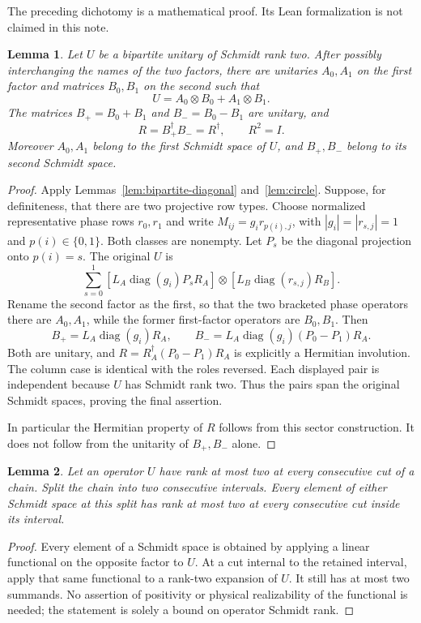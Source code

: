 \documentclass[11pt]{article}
\newtheorem{lemma}{Lemma}
\begin{document}
The preceding dichotomy is a mathematical proof. Its Lean formalization
is not claimed in this note.

\begin{lemma}\label{lem:two-sectors}
Let $U$ be a bipartite unitary of Schmidt rank two. After possibly
interchanging the names of the two factors, there are unitaries
$A_0,A_1$ on the first factor and matrices $B_0,B_1$ on the second such
that
\[
 U=A_0\otimes B_0+A_1\otimes B_1.
\]
The matrices $B_+=B_0+B_1$ and $B_-=B_0-B_1$ are unitary, and
\[
 R=B_+^\dagger B_-=R^\dagger,\qquad R^2=I.
\]
Moreover $A_0,A_1$ belong to the first Schmidt space of $U$, and
$B_+,B_-$ belong to its second Schmidt space.
\end{lemma}
\begin{proof}
Apply Lemmas~\ref{lem:bipartite-diagonal} and~\ref{lem:circle}.
Suppose, for definiteness, that there are two projective row types.
Choose normalized representative phase rows $r_0,r_1$ and write
$M_{ij}=g_i r_{p(i),j}$, with $|g_i|=|r_{s,j}|=1$ and
$p(i)\in\{0,1\}$. Both classes are nonempty. Let $P_s$ be the
diagonal projection onto $p(i)=s$. The original $U$ is
\[
 \sum_{s=0}^1
 \left[L_A\operatorname{diag}(g_i)P_sR_A\right]\otimes
 \left[L_B\operatorname{diag}(r_{s,j})R_B\right].
\]
Rename the second factor as the first, so that the two bracketed phase
operators there are $A_0,A_1$, while the former first-factor operators
are $B_0,B_1$. Then
\[
 B_+=L_A\operatorname{diag}(g_i)R_A,
 \qquad
 B_-=L_A\operatorname{diag}(g_i)(P_0-P_1)R_A.
\]
Both are unitary, and
$R=R_A^\dagger(P_0-P_1)R_A$ is explicitly a Hermitian involution.
The column case is identical with the roles reversed. Each displayed
pair is independent because $U$ has Schmidt rank two. Thus the pairs
span the original Schmidt spaces, proving the final assertion.

In particular the Hermitian property of $R$ follows from this sector
construction. It does not follow from the unitarity of $B_+,B_-$ alone.
\end{proof}

\begin{lemma}\label{lem:inheritance}
Let an operator $U$ have rank at most two at every consecutive cut of
a chain. Split the chain into two consecutive intervals. Every element
of either Schmidt space at this split has rank at most two at every
consecutive cut inside its interval.
\end{lemma}
\begin{proof}
Every element of a Schmidt space is obtained by applying a linear
functional on the opposite factor to $U$. At a cut internal to the
retained interval, apply that same functional to a rank-two expansion
of $U$. It still has at most two summands. No assertion of positivity or
physical realizability of the functional is needed; the statement is
solely a bound on operator Schmidt rank.
\end{proof}
\end{document}
